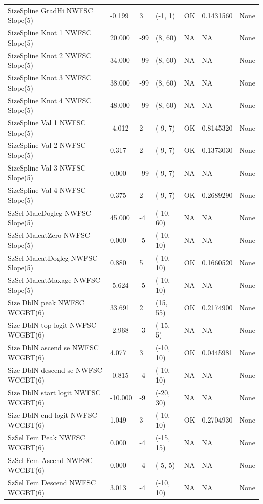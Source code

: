 \documentclass[11pt,
  english,
  a4paper,
]{article}
\begin{document}
\begin{landscape}
\begin{longtable}[t]{>{\raggedright\arraybackslash}p{7cm}lllll>{\raggedright\arraybackslash}p{4cm}}
SizeSpline GradHi NWFSC Slope(5) & -0.199 & 3 & (-1, 1) & OK & 0.1431560 & None\\
SizeSpline Knot 1 NWFSC Slope(5) & 20.000 & -99 & (8, 60) & NA & NA & None\\
SizeSpline Knot 2 NWFSC Slope(5) & 34.000 & -99 & (8, 60) & NA & NA & None\\
SizeSpline Knot 3 NWFSC Slope(5) & 38.000 & -99 & (8, 60) & NA & NA & None\\
SizeSpline Knot 4 NWFSC Slope(5) & 48.000 & -99 & (8, 60) & NA & NA & None\\
SizeSpline Val 1 NWFSC Slope(5) & -4.012 & 2 & (-9, 7) & OK & 0.8145320 & None\\
SizeSpline Val 2 NWFSC Slope(5) & 0.317 & 2 & (-9, 7) & OK & 0.1373030 & None\\
SizeSpline Val 3 NWFSC Slope(5) & 0.000 & -99 & (-9, 7) & NA & NA & None\\
SizeSpline Val 4 NWFSC Slope(5) & 0.375 & 2 & (-9, 7) & OK & 0.2689290 & None\\
SzSel MaleDogleg NWFSC Slope(5) & 45.000 & -4 & (-10, 60) & NA & NA & None\\
SzSel MaleatZero NWFSC Slope(5) & 0.000 & -5 & (-10, 10) & NA & NA & None\\
SzSel MaleatDogleg NWFSC Slope(5) & 0.880 & 5 & (-10, 10) & OK & 0.1660520 & None\\
SzSel MaleatMaxage NWFSC Slope(5) & -5.624 & -5 & (-10, 10) & NA & NA & None\\
Size DblN peak NWFSC WCGBT(6) & 33.691 & 2 & (15, 55) & OK & 0.2174900 & None\\
Size DblN top logit NWFSC WCGBT(6) & -2.968 & -3 & (-15, 5) & NA & NA & None\\
Size DblN ascend se NWFSC WCGBT(6) & 4.077 & 3 & (-10, 10) & OK & 0.0445981 & None\\
Size DblN descend se NWFSC WCGBT(6) & -0.815 & -4 & (-10, 10) & NA & NA & None\\
Size DblN start logit NWFSC WCGBT(6) & -10.000 & -9 & (-20, 30) & NA & NA & None\\
Size DblN end logit NWFSC WCGBT(6) & 1.049 & 3 & (-10, 10) & OK & 0.2704930 & None\\
SzSel Fem Peak NWFSC WCGBT(6) & 0.000 & -4 & (-15, 15) & NA & NA & None\\
SzSel Fem Ascend NWFSC WCGBT(6) & 0.000 & -4 & (-5, 5) & NA & NA & None\\
SzSel Fem Descend NWFSC WCGBT(6) & 3.013 & -4 & (-10, 10) & NA & NA & None\\

\end{longtable}
\end{landscape}
\end{document}
